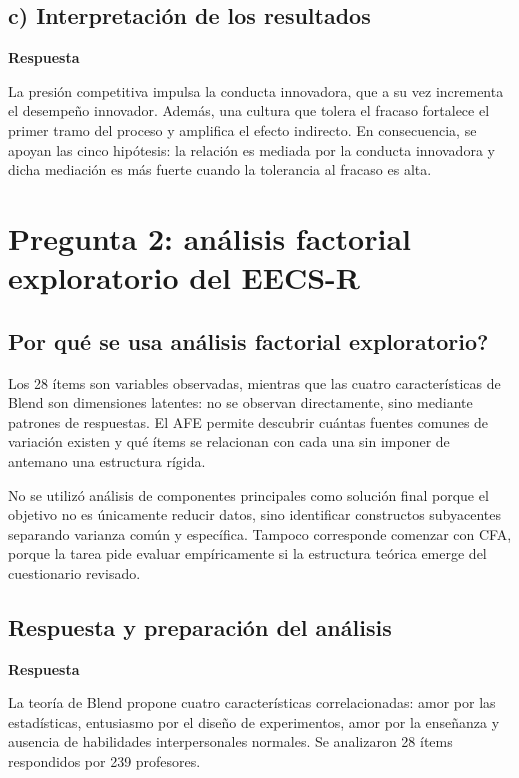 \documentclass[11pt,letterpaper]{article}
\begin{document}
\subsection{c) Interpretación de los resultados}

\textbf{Respuesta}

La presión competitiva impulsa la conducta innovadora, que a su vez incrementa el desempeño innovador. Además, una cultura que tolera el fracaso fortalece el primer tramo del proceso y amplifica el efecto indirecto. En consecuencia, se apoyan las cinco hipótesis: la relación es mediada por la conducta innovadora y dicha mediación es más fuerte cuando la tolerancia al fracaso es alta.

\section{Pregunta 2: análisis factorial exploratorio del EECS-R}

\subsection{\texorpdfstring{\textquestiondown Por qué se usa análisis factorial exploratorio?}{Por qué se usa análisis factorial exploratorio?}}

Los 28 ítems son variables observadas, mientras que las cuatro características de Blend son dimensiones latentes: no se observan directamente, sino mediante patrones de respuestas. El AFE permite descubrir cuántas fuentes comunes de variación existen y qué ítems se relacionan con cada una sin imponer de antemano una estructura rígida.

No se utilizó análisis de componentes principales como solución final porque el objetivo no es únicamente reducir datos, sino identificar constructos subyacentes separando varianza común y específica. Tampoco corresponde comenzar con CFA, porque la tarea pide evaluar empíricamente si la estructura teórica emerge del cuestionario revisado.

\subsection{Respuesta y preparación del análisis}

\textbf{Respuesta}

La teoría de Blend propone cuatro características correlacionadas: amor por las estadísticas, entusiasmo por el diseño de experimentos, amor por la enseñanza y ausencia de habilidades interpersonales normales. Se analizaron 28 ítems respondidos por 239 profesores.
\end{document}
